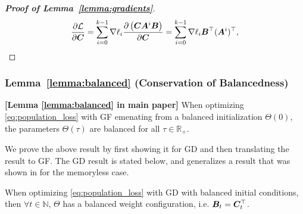 \begin{proof}[\textbf{Proof of Lemma~\ref{lemma:gradients}}]
\begin{equation}
    \frac{\partial \mathcal{L}}{\partial {\bm{C}}} = \sum_{i=0}^{k-1} \nabla \ell_i \frac{\partial\left( {\bm{C}}{\bm{A}}^i{\bm{B}} \right)}{\partial {\bm{C}}} = \sum_{i=0}^{k-1} \nabla \ell_i {\bm{B}}^\top({\bm{A}}^i)^\top,
\end{equation}


\end{proof}


\subsubsection{Lemma~\ref{lemma:balanced} (Conservation of Balancedness)}\label{sec:lemma_balanced_proof}

\begin{lemma} \textbf{[Lemma \ref{lemma:balanced} in main paper]}
When optimizing \eqref{eq:population_loss} with GF emenating from a balanced initialization $\Theta(0)$, the parameters $\Theta(\tau)$ are balanced for all $\tau \in \mathbb{R}_+$.
\end{lemma}

We prove the above result by first showing it for GD and then translating the result to GF. The GD result is stated below, and generalizes a result that was shown in \cite{cohen2022extrapolation} for the memoryless case.

\begin{lemma}\label{lemma:gd_invariance}
When optimizing \eqref{eq:population_loss} with GD with balanced initial conditions, then $\forall t\in\mathbb{N}$, $\Theta$ has a balanced weight configuration, i.e. ${\bm{B}}_t={\bm{C}}_t^\top$.
\end{lemma}

